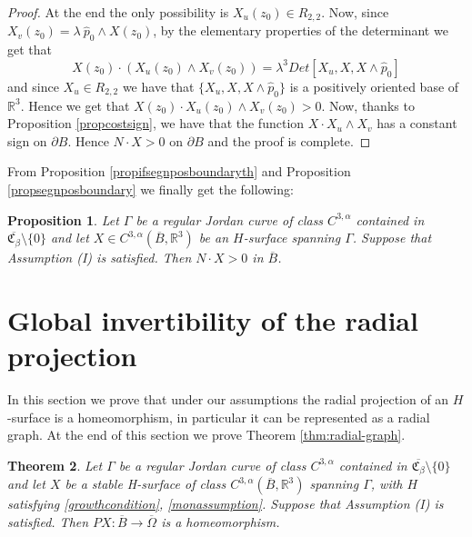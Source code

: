 \documentclass[a4paper,reqno,10pt,oneside]{amsart}
\numberwithin{equation}{section}
\newtheorem{theorem}{Theorem}[section]
\newtheorem{proposition}[theorem]{Proposition}
\begin{document}
\begin{proof}
 At the end the only possibility is $X_u(z_0) \in R_{2,2}$. 
Now, since $X_v(z_0)=\lambda\  \hat p_0 \wedge X(z_0)$, by the elementary properties of the determinant we get that 
 $$X(z_0) \cdot (X_u(z_0) \wedge X_v(z_0))=\lambda^3 Det\left[X_u,X,X\wedge \hat p_0\right]$$
and since $X_u \in R_{2,2}$ we have that $\{X_u,X,X\wedge \hat p_0\}$ is a positively oriented base of ${\mathbb R}^3$. Hence we get that $X(z_0) \cdot X_u(z_0) \wedge X_v(z_0)>0$. Now, thanks to Proposition \ref{propcostsign}, we have that the function $X\cdot X_u \wedge X_v$ has a constant sign on $\partial B$. Hence $N \cdot X>0$ on $\partial B$ and the proof is complete.
 
\end{proof}
 
From Proposition \ref{propifsegnposboundaryth} and Proposition \ref{propsegnposboundary} we finally get the following:

\begin{proposition} \label{propnormscalxpos}
Let $\Gamma$ be a regular Jordan curve of class $C^{3,\alpha}$ contained in $\overline{\mathfrak{C}_\beta}\setminus \{0\}$ and let $X \in C^{3,\alpha}(\overline{B}, {\mathbb R}^3)$ be an $H$-surface spanning $\Gamma$. Suppose that Assumption (I) is satisfied. Then $N \cdot X>0$ in $\overline B$.
\end{proposition}

\section{Global invertibility of the radial projection}
In this section we prove that under our assumptions the radial projection of an $H$-surface is a homeomorphism, in particular it can be represented as a radial graph. At the end of this section we prove Theorem \ref{thm:radial-graph}.

\begin{theorem}\label{mainteoglobinv}
Let $\Gamma$ be a regular Jordan curve of class $C^{3,\alpha}$ contained in $\overline{\mathfrak{C}_\beta}\setminus \{0\}$  and let $X$ be a stable H-surface of class $C^{3,\alpha}(\overline{B}, {\mathbb R}^3)$ spanning $\Gamma$, with $H$ satisfying \eqref{growthcondition}, \eqref{monassumption}. Suppose that Assumption (I) is satisfied. 
Then $PX\colon\overline{B} \to \overline{\Omega}$ is a homeomorphism. 
\end{theorem}
\end{document}
